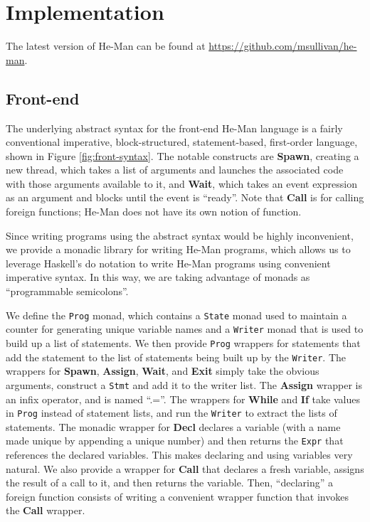 \documentclass[preprint]{sigplanconf}
\renewcommand{\t}{\texttt}
\renewcommand{\b}{\textbf}
\begin{document}
\section{Implementation}

The latest version of He-Man can be found at
\url{https://github.com/msullivan/he-man}.

\subsection{Front-end}

The underlying abstract syntax for the front-end He-Man language is a
fairly conventional imperative, block-structured, statement-based,
first-order language, shown in Figure \ref{fig:front-syntax}. The
notable constructs are \b{Spawn}, creating a new thread, which takes a
list of arguments and launches the associated code with those
arguments available to it, and \b{Wait}, which takes an event
expression as an argument and blocks until the event is
``ready''. Note that \b{Call} is for calling foreign functions; He-Man
does not have its own notion of function.

Since writing programs using the abstract syntax would be highly
inconvenient, we provide a monadic library for writing He-Man
programs, which allows us to leverage Haskell's do notation to write
He-Man programs using convenient imperative syntax. In this way, we
are taking advantage of monads as ``programmable semicolons''.

We define the \t{Prog} monad, which contains a \t{State} monad used to
maintain a counter for generating unique variable names and a
\t{Writer} monad that is used to build up a list of statements. We
then provide \t{Prog} wrappers for statements that add the statement
to the list of statements being built up by the \t{Writer}. The
wrappers for \b{Spawn}, \b{Assign}, \b{Wait}, and \b{Exit} simply take
the obvious arguments, construct a \t{Stmt} and add it to the writer
list. The \b{Assign} wrapper is an infix operator, and is named
``.=''. The wrappers for \b{While} and \b{If} take values in \t{Prog}
instead of statement lists, and run the \t{Writer} to extract the
lists of statements. The monadic wrapper for \b{Decl} declares a
variable (with a name made unique by appending a unique number) and
then returns the \t{Expr} that references the declared variables. This
makes declaring and using variables very natural. We also provide a
wrapper for \b{Call} that declares a fresh variable, assigns the
result of a call to it, and then returns the variable. Then,
``declaring'' a foreign function consists of writing a convenient
wrapper function that invokes the \b{Call} wrapper.
\end{document}
